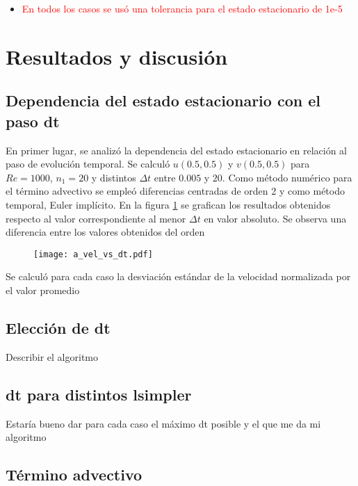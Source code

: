 \documentclass[aps,prb,twocolumn,superscriptaddress,floatfix,longbibliography,10pt]{revtex4-2}
\newcounter{para}
\begin{document}
\begin{itemize}
  \item \textcolor{red}{En todos los casos se usó una tolerancia para el estado estacionario de 1e-5}
\end{itemize}

\section{Resultados y discusión}


\subsection{Dependencia del estado estacionario con el paso dt}

En primer lugar, se analizó la dependencia del estado estacionario en relación al paso de evolución temporal. Se calculó $u(0.5,0.5)$ y $v(0.5,0.5)$ para $Re = 1000$, $n_1 = 20$ y distintos $\Delta t$ entre $0.005$ y $20$. Como método numérico para el término advectivo se empleó diferencias centradas de orden 2 y como método temporal, Euler implícito. En la figura \ref{fig:a_vel_vs_dt} se grafican los resultados obtenidos respecto al valor correspondiente al menor $\Delta t$ en valor absoluto. Se observa una diferencia entre los valores obtenidos del orden 

\begin{figure}[h]
  \texttt{[image: a\_vel\_vs\_dt.pdf]}
  \caption{}
   \label{fig:a_vel_vs_dt}
\end{figure}

Se calculó para cada caso la desviación estándar de la velocidad normalizada por el valor promedio

\subsection{Elección de dt}
Describir el algoritmo

\subsection{dt para distintos lsimpler}

Estaría bueno dar para cada caso el máximo dt posible y el que me da mi algoritmo

\subsection{Término advectivo}
\end{document}
